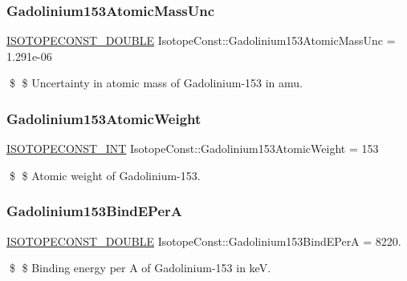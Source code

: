 \subsubsection{\texorpdfstring{Gadolinium153\+Atomic\+Mass\+Unc}{Gadolinium153AtomicMassUnc}}
{\footnotesize\ttfamily \mbox{\hyperlink{group___isotope_const-_macros_ga8f45a7272ce02c0b4c65c44636ed719a}{I\+S\+O\+T\+O\+P\+E\+C\+O\+N\+S\+T\+\_\+\+D\+O\+U\+B\+LE}} Isotope\+Const\+::\+Gadolinium153\+Atomic\+Mass\+Unc = 1.\+291e-\/06}

\$ \$ Uncertainty in atomic mass of Gadolinium-\/153 in amu. \mbox{\label{group___isotope_const-_gadolinium-_gd153_gab943eb33b2ed6a8d34f0e458131a2463}} 
\subsubsection{\texorpdfstring{Gadolinium153\+Atomic\+Weight}{Gadolinium153AtomicWeight}}
{\footnotesize\ttfamily \mbox{\hyperlink{group___isotope_const-_macros_ga5f18360b3e99483a35c32d789e62621c}{I\+S\+O\+T\+O\+P\+E\+C\+O\+N\+S\+T\+\_\+\+I\+NT}} Isotope\+Const\+::\+Gadolinium153\+Atomic\+Weight = 153}

\$ \$ Atomic weight of Gadolinium-\/153. \mbox{\label{group___isotope_const-_gadolinium-_gd153_ga3eb241a0a206b79eebb10af7c482f185}} 
\subsubsection{\texorpdfstring{Gadolinium153\+Bind\+E\+PerA}{Gadolinium153BindEPerA}}
{\footnotesize\ttfamily \mbox{\hyperlink{group___isotope_const-_macros_ga8f45a7272ce02c0b4c65c44636ed719a}{I\+S\+O\+T\+O\+P\+E\+C\+O\+N\+S\+T\+\_\+\+D\+O\+U\+B\+LE}} Isotope\+Const\+::\+Gadolinium153\+Bind\+E\+PerA = 8220.}

\$ \$ Binding energy per A of Gadolinium-\/153 in keV. \mbox{\label{group___isotope_const-_gadolinium-_gd153_ga9b5dbb4516bf628576a2094bf702f7f0}} 
